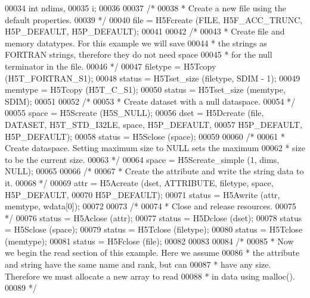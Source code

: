 \begin{DoxyCode}
00034     \textcolor{keywordtype}{int}         ndims,
00035                 i;
00036 
00037     \textcolor{comment}{/*}
00038 \textcolor{comment}{     * Create a new file using the default properties.}
00039 \textcolor{comment}{     */}
00040     file = H5Fcreate (FILE, H5F\_ACC\_TRUNC, H5P\_DEFAULT, H5P\_DEFAULT);
00041 
00042     \textcolor{comment}{/*}
00043 \textcolor{comment}{     * Create file and memory datatypes.  For this example we will save}
00044 \textcolor{comment}{     * the strings as FORTRAN strings, therefore they do not need space}
00045 \textcolor{comment}{     * for the null terminator in the file.}
00046 \textcolor{comment}{     */}
00047     filetype = H5Tcopy (H5T\_FORTRAN\_S1);
00048     status = H5Tset\_size (filetype, SDIM - 1);
00049     memtype = H5Tcopy (H5T\_C\_S1);
00050     status = H5Tset\_size (memtype, SDIM);
00051 
00052     \textcolor{comment}{/*}
00053 \textcolor{comment}{     * Create dataset with a null dataspace.}
00054 \textcolor{comment}{     */}
00055     space = H5Screate (H5S\_NULL);
00056     dset = H5Dcreate (file, DATASET, H5T\_STD\_I32LE, space, H5P\_DEFAULT,
00057                 H5P\_DEFAULT, H5P\_DEFAULT);
00058     status = H5Sclose (space);
00059 
00060     \textcolor{comment}{/*}
00061 \textcolor{comment}{     * Create dataspace.  Setting maximum size to NULL sets the maximum}
00062 \textcolor{comment}{     * size to be the current size.}
00063 \textcolor{comment}{     */}
00064     space = H5Screate\_simple (1, dims, NULL);
00065 
00066     \textcolor{comment}{/*}
00067 \textcolor{comment}{     * Create the attribute and write the string data to it.}
00068 \textcolor{comment}{     */}
00069     attr = H5Acreate (dset, ATTRIBUTE, filetype, space, H5P\_DEFAULT,
00070                 H5P\_DEFAULT);
00071     status = H5Awrite (attr, memtype, wdata[0]);
00072 
00073     \textcolor{comment}{/*}
00074 \textcolor{comment}{     * Close and release resources.}
00075 \textcolor{comment}{     */}
00076     status = H5Aclose (attr);
00077     status = H5Dclose (dset);
00078     status = H5Sclose (space);
00079     status = H5Tclose (filetype);
00080     status = H5Tclose (memtype);
00081     status = H5Fclose (file);
00082 
00083 
00084     \textcolor{comment}{/*}
00085 \textcolor{comment}{     * Now we begin the read section of this example.  Here we assume}
00086 \textcolor{comment}{     * the attribute and string have the same name and rank, but can}
00087 \textcolor{comment}{     * have any size.  Therefore we must allocate a new array to read}
00088 \textcolor{comment}{     * in data using malloc().}
00089 \textcolor{comment}{     */}

\end{DoxyCode}
